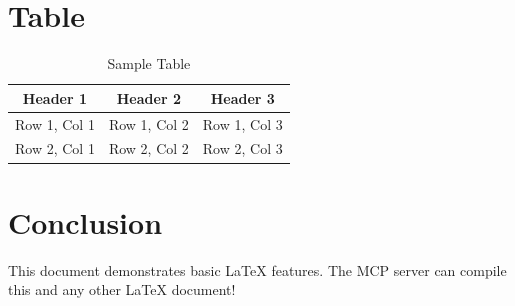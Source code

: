 \documentclass{article}
\begin{document}
\section{Table}

\begin{table}[h]
\centering
\begin{tabular}{|c|c|c|}
\hline
Header 1 & Header 2 & Header 3 \\
\hline
Row 1, Col 1 & Row 1, Col 2 & Row 1, Col 3 \\
Row 2, Col 1 & Row 2, Col 2 & Row 2, Col 3 \\
\hline
\end{tabular}
\caption{Sample Table}
\end{table}

\section{Conclusion}

This document demonstrates basic LaTeX features. The MCP server can compile this and any other LaTeX document!
\end{document}
